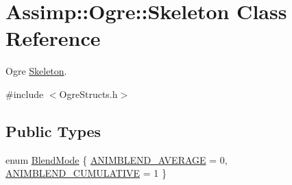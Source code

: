 \hypertarget{class_assimp_1_1_ogre_1_1_skeleton}{\section{Assimp\+:\+:Ogre\+:\+:Skeleton Class Reference}
\label{class_assimp_1_1_ogre_1_1_skeleton}
}


Ogre \hyperlink{class_assimp_1_1_ogre_1_1_skeleton}{Skeleton}.  




{\ttfamily \#include $<$Ogre\+Structs.\+h$>$}

\subsection*{Public Types}
\begin{DoxyCompactItemize}
\item 
enum \hyperlink{class_assimp_1_1_ogre_1_1_skeleton_a0a066387662c0279034d75bee5893b23}{Blend\+Mode} \{ \hyperlink{class_assimp_1_1_ogre_1_1_skeleton_a0a066387662c0279034d75bee5893b23a92fe990732ce159a2fdf5ed50b846d98}{A\+N\+I\+M\+B\+L\+E\+N\+D\+\_\+\+A\+V\+E\+R\+A\+G\+E} = 0, 
\hyperlink{class_assimp_1_1_ogre_1_1_skeleton_a0a066387662c0279034d75bee5893b23a7867b19c3b71ec6d57078477bae4b012}{A\+N\+I\+M\+B\+L\+E\+N\+D\+\_\+\+C\+U\+M\+U\+L\+A\+T\+I\+V\+E} = 1
 \}
\end{DoxyCompactItemize}
